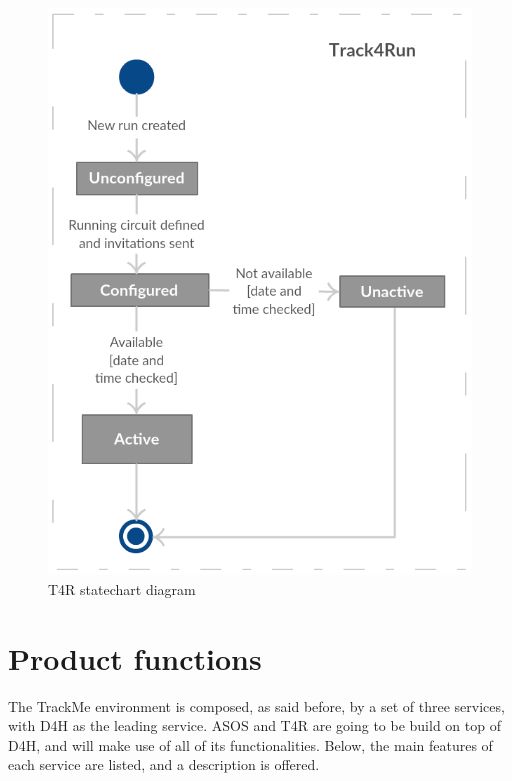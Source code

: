 \documentclass[hidelinks, 12pt]{report}
\begin{document}
 \begin{figure}[H]
\centering
 \includegraphics[scale=0.55]{Diagrams/t4r_statechart.png}
\caption[T4R statechart diagram]{T4R statechart diagram}
\label{fig:t4r_statechart}
\end{figure}

\section{Product functions}
The TrackMe environment is composed, as said before, by a set of three services, with D4H as the leading service. ASOS and T4R are going to be build on top of D4H, and will make use of all of its functionalities. Below, the main features of each service are listed, and a description is offered.
\end{document}
